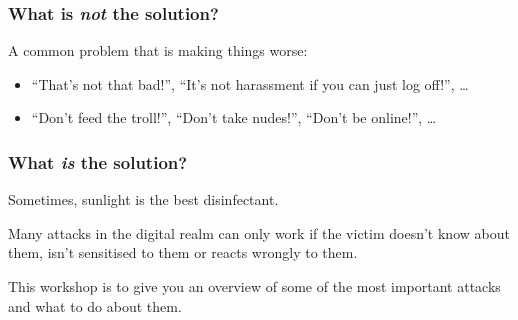 \documentclass[aspectratio=169,dvipsnames]{beamer}
\begin{document}
\begin{frame}
\frametitle{What is \emph{not} the solution?}

A common problem that is making things worse:
\bigskip

\begin{center}
\end{center}
\pause\bigskip

\begin{itemize}
\item ``That's not that bad!'', ``It's not harassment if you can just log off!'', \dots
\item ``Don't feed the troll!'', ``Don't take nudes!'', ``Don't be online!'', \dots
\end{itemize}
\end{frame}

\begin{frame}
\frametitle{What \emph{is} the solution?}
\begin{center}
\Large
Sometimes, sunlight is the best disinfectant.
\end{center}
\normalsize\bigskip

Many attacks in the digital realm can only work if the victim doesn't know about them, isn't sensitised to them or reacts wrongly to them.
\medskip\pause

This workshop is to give you an overview of some of the most important attacks and what to do about them.
\end{frame}
\end{document}
